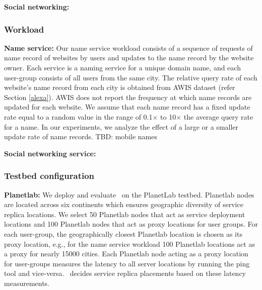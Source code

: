 {\bf Social networking:}

\subsubsection{Workload}

\textbf{Name service:}  Our name service workload consists of a sequence of requests  of name record of websites by users and updates to the name record by the website owner.
Each service is a naming service for a unique domain name, and each user-group consists of all users from the same city.
The relative query rate of each website's name record from each city is obtained from AWIS dataset (refer Section \ref{alexa}).
AWIS does not report the frequency at which name records are updated for each website.
We assume that each name record has a fixed update rate equal to a random value in the range of 0.1$\times$ to 10$\times$ the average query rate for a name. 
In our experiments, we analyze the effect of a large or a smaller update rate of name records.
TBD: mobile names
%
%
%
%
%

\textbf{Social networking service:} 


\subsubsection{Testbed configuration}

\textbf{Planetlab:} We deploy and evaluate \auspice\ on the PlanetLab testbed. Planetlab nodes are located across six continents which ensures geographic diversity of service replica locations. 
We select 50 Planetlab nodes that act as service deployment locations and 100 Planetlab nodes that act as proxy locations for user groups.
For each user-group, the geographically closest Planetlab location is chosen as its proxy location, e.g., for the name service workload 100 Planetlab locations  act as a proxy for nearly 15000 cities.
Each Planetlab node acting as a proxy location for user-groups measures the latency to all server locations by running the ping tool and vice-versa. \auspice\ decides service replica placements based on these latency measurements. 

